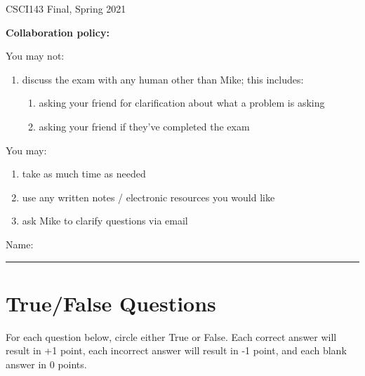 \documentclass[12pt]{exam}
\theoremstyle{definition}
\begin{document}
\begin{center}
    {
\Large
    CSCI143 Final, Spring 2021
}

    \vspace{0.1in}
\end{center}

\noindent
\textbf{Collaboration policy:} 

\vspace{0.1in}
\noindent
You may not:
\begin{enumerate}
    \item discuss the exam with any human other than Mike; this includes:
        \begin{enumerate}
            \item asking your friend for clarification about what a problem is asking
            \item asking your friend if they've completed the exam
        \end{enumerate}
\end{enumerate}

\noindent
You may:
\begin{enumerate}
    \item take as much time as needed
    \item use any written notes / electronic resources you would like
    \item ask Mike to clarify questions via email
\end{enumerate}


\vspace{0.15in}

\vspace{0.25in}
\noindent
Name: 

\noindent
\rule{\textwidth}{0.1pt}
\vspace{0.15in}

\newpage
\section{True/False Questions}

For each question below, circle either True or False.
Each correct answer will result in +1 point,
each incorrect answer will result in -1 point,
and each blank answer in 0 points.
\end{document}
